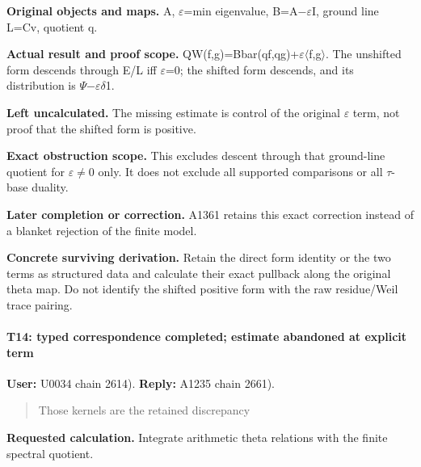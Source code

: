 \textbf{Original objects and maps.} A,
\allowbreak{}\ensuremath{ε}\allowbreak{}=min eigenvalue,
B=A\allowbreak{}\ensuremath{−}\allowbreak{}\allowbreak{}\ensuremath{ε}\allowbreak{}I,
ground line L=Cv, quotient q.

\textbf{Actual result and proof scope.}
QW(f,g)=Bbar(qf,qg)+\allowbreak{}\ensuremath{ε}\allowbreak{}\allowbreak{}\ensuremath{\langle}\allowbreak{}f,g\allowbreak{}\ensuremath{\rangle}\allowbreak{}.
The unshifted form descends through E/L iff
\allowbreak{}\ensuremath{ε}\allowbreak{}=0; the shifted form descends,
and its distribution is
\allowbreak{}\ensuremath{Ψ}\allowbreak{}\allowbreak{}\ensuremath{−}\allowbreak{}\allowbreak{}\ensuremath{ε}\allowbreak{}\allowbreak{}\ensuremath{δ}\allowbreak{}1.

\textbf{Left uncalculated.} The missing estimate is control of the
original \allowbreak{}\ensuremath{ε}\allowbreak{} term, not proof that
the shifted form is positive.

\textbf{Exact obstruction scope.} This excludes descent through that
ground-line quotient for
\allowbreak{}\ensuremath{ε}\allowbreak{}\allowbreak{}\ensuremath{≠}\allowbreak{}0
only. It does not exclude all supported comparisons or all
\allowbreak{}\ensuremath{τ}\allowbreak{}-base duality.

\textbf{Later completion or correction.} A1361 retains this exact
correction instead of a blanket rejection of the finite model.

\textbf{Concrete surviving derivation.} Retain the direct form identity
or the two terms as structured data and calculate their exact pullback
along the original theta map. Do not identify the shifted positive form
with the raw residue/Weil trace pairing.

\paragraph{T14: typed correspondence completed; estimate abandoned at
explicit
term}\label{t14-typed-correspondence-completed-estimate-abandoned-at-explicit-term}

\textbf{User:} U0034
\protect{} chain 2614).
\textbf{Reply:} A1235
\protect{} chain 2661).

\begin{quote}
Those kernels are the retained discrepancy
\end{quote}

\textbf{Requested calculation.} Integrate arithmetic theta relations
with the finite spectral quotient.

